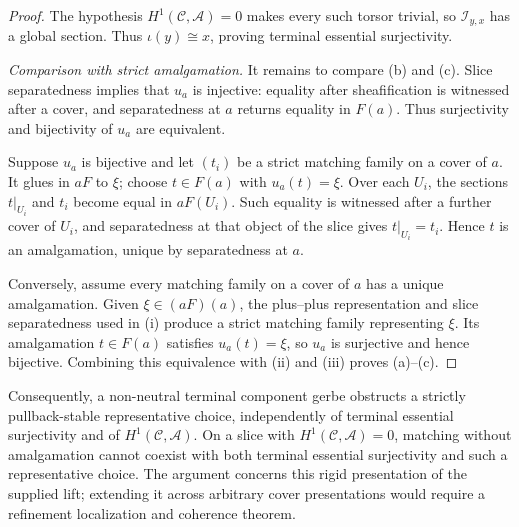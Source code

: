 \begin{proof}
The hypothesis \(H^1(\mathcal C,\mathscr A)=0\) makes every such torsor
trivial, so \(\mathcal I_{y,x}\) has a global section.  Thus
\(\iota(y)\cong x\), proving terminal essential surjectivity.

\medskip
\noindent\emph{Comparison with strict amalgamation.}
It remains to compare (b) and (c).  Slice separatedness implies that \(u_a\)
is injective: equality after sheafification is witnessed after a cover, and
separatedness at \(a\) returns equality in \(F(a)\).  Thus surjectivity and
bijectivity of \(u_a\) are equivalent.

Suppose \(u_a\) is bijective and let \((t_i)\) be a strict matching family
on a cover of \(a\).  It glues in \(aF\) to \(\xi\); choose
\(t\in F(a)\) with \(u_a(t)=\xi\).  Over each \(U_i\), the sections
\(t|_{U_i}\) and \(t_i\) become equal in \(aF(U_i)\).  Such equality is
witnessed after a further cover of \(U_i\), and separatedness at that object
of the slice gives \(t|_{U_i}=t_i\).  Hence \(t\) is an amalgamation, unique
by separatedness at \(a\).

Conversely, assume every matching family on a cover of \(a\) has a unique
amalgamation.  Given \(\xi\in(aF)(a)\), the plus--plus representation and
slice separatedness used in
(i) produce a strict matching
family representing \(\xi\).  Its amalgamation \(t\in F(a)\) satisfies
\(u_a(t)=\xi\), so \(u_a\) is surjective and hence bijective.  Combining
this equivalence with (ii) and (iii) proves (a)--(c).

\end{proof}

Consequently, a non-neutral terminal component gerbe obstructs a strictly
pullback-stable representative choice, independently of terminal essential
surjectivity and of \(H^1(\mathcal C,\mathscr A)\).  On a slice with
\(H^1(\mathcal C,\mathscr A)=0\), matching without amalgamation cannot
coexist with both terminal essential surjectivity and such a representative
choice.  The argument concerns this rigid presentation of the supplied lift;
extending it across arbitrary cover presentations would require a refinement
localization and coherence theorem.
